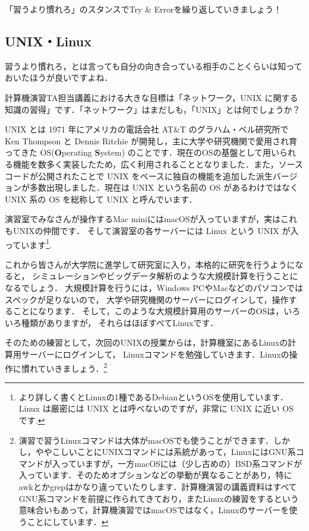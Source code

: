 \documentclass{jarticle}
\begin{document}
「習うより慣れろ」のスタンスでTry \& Errorを繰り返していきましょう！

\subsection{UNIX・Linux}
習うより慣れろ，とは言っても自分の向き合っている相手のことくらいは知っておいたほうが良いですよね．

計算機演習TA担当講義における大きな目標は「ネットワーク，UNIX に関する知識の習得」です．「ネットワーク」はまだしも，「UNIX」とは何でしょうか？

\vspace{1em}

UNIX とは 1971 年にアメリカの電話会社 AT\&T のグラハム・ベル研究所で Ken Thompson と Dennis Ritchie が開発し，主に大学や研究機関で愛用され育ってきた OS(\textbf{O}perating \textbf{S}ystem) のことです．現在のOSの基盤として用いられる機能を数多く実装したため，広く利用されることとなりました．また，ソースコードが公開されたことで UNIX をベースに独自の機能を追加した派生バージョンが多数出現しました．現在は UNIX という名前の OS があるわけではなく UNIX 系の OS を総称して UNIX と呼んでいます．


演習室でみなさんが操作するMac miniにはmacOSが入っていますが，実はこれもUNIXの仲間です．
そして演習室の各サーバーには Linux という UNIX が入っています\footnote{より詳しく書くとLinuxの1種であるDebianというOSを使用しています．Linux は厳密には UNIX とは呼べないのですが，非常に UNIX に近い OS です.}.

\vspace{1em}

これから皆さんが大学院に進学して研究室に入り，本格的に研究を行うようになると，
シミュレーションやビッグデータ解析のような大規模計算を行うことになるでしょう．
大規模計算を行うには，Windows PCやMacなどのパソコンではスペックが足りないので，
大学や研究機関のサーバーにログインして，操作することになります．
そして，このような大規模計算用のサーバーのOSは，いろいろ種類がありますが，
それらはほぼすべてLinuxです．

そのための練習として，次回のUNIXの授業からは，計算機室にあるLinuxの計算用サーバーにログインして，
Linuxコマンドを勉強していきます．Linuxの操作に慣れていきましょう．\footnote{演習で習うLinuxコマンドは大体がmacOSでも使うことができます．しかし，ややこしいことにUNIXコマンドには系統があって，LinuxにはGNU系コマンドが入っていますが，一方macOSには（少し古めの）BSD系コマンドが入っています．そのためオプションなどの挙動が異なることがあり，特にawkとかgrepはかなり違っていたりします．計算機演習の講義資料はすべてGNU系コマンドを前提に作られてきており，またLinuxの練習をするという意味合いもあって，計算機演習ではmacOSではなく，Linuxのサーバーを使うことにしています．}
\end{document}
